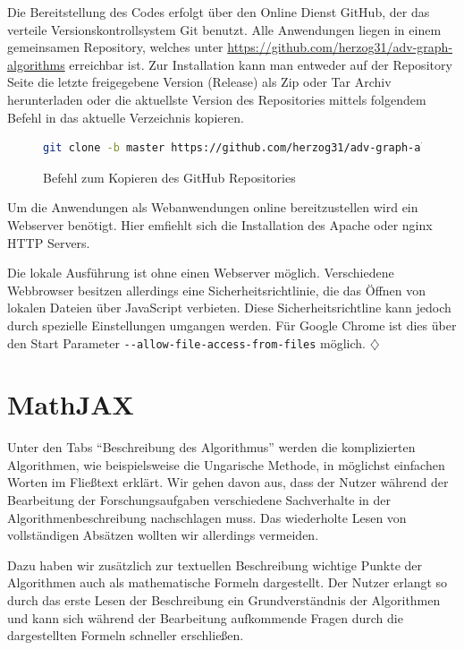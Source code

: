 Die Bereitstellung des Codes erfolgt über den Online Dienst GitHub, der das verteile Versionskontrollsystem Git benutzt. 
Alle Anwendungen liegen in einem gemeinsamen Repository, welches unter \url{https://github.com/herzog31/adv-graph-algorithms} erreichbar ist. Zur Installation kann man entweder auf der Repository Seite die letzte freigegebene Version (Release) als Zip oder Tar Archiv herunterladen oder die aktuellste Version des Repositories mittels folgendem Befehl in das aktuelle Verzeichnis kopieren.

\begin{figure}[h!]
\begin{lstlisting}[language=Bash]
git clone -b master https://github.com/herzog31/adv-graph-algorithms.git
\end{lstlisting}
\caption[Installation: Repository kopieren]{Befehl zum Kopieren des GitHub Repositories}\label{fig:listing-github}
\end{figure}

Um die Anwendungen als Webanwendungen online bereitzustellen wird ein Webserver benötigt. Hier emfiehlt sich die Installation des Apache oder nginx  HTTP Servers.

Die lokale Ausführung ist ohne einen Webserver möglich. Verschiedene Webbrowser besitzen allerdings eine Sicherheitsrichtlinie, die das Öffnen von lokalen Dateien über JavaScript verbieten. Diese Sicherheitsrichtline kann jedoch durch spezielle Einstellungen umgangen werden. Für Google Chrome ist dies über den Start Parameter \texttt{-{}-allow-file-access-from-files} möglich. \hfill$\diamondsuit$

\section{MathJAX} %
Unter den Tabs \enquote{Beschreibung des Algorithmus} werden die komplizierten Algorithmen, wie beispielsweise die Ungarische Methode, in möglichst einfachen Worten im Fließtext erklärt. Wir gehen davon aus, dass der Nutzer während der Bearbeitung der Forschungsaufgaben verschiedene Sachverhalte in der Algorithmenbeschreibung nachschlagen muss. Das wiederholte Lesen von vollständigen Absätzen wollten wir allerdings vermeiden.

Dazu haben wir zusätzlich zur textuellen Beschreibung wichtige Punkte der Algorithmen auch als mathematische Formeln dargestellt. Der Nutzer erlangt so durch das erste Lesen der Beschreibung ein Grundverständnis der Algorithmen und kann sich während der Bearbeitung aufkommende Fragen durch die dargestellten Formeln schneller erschließen.

